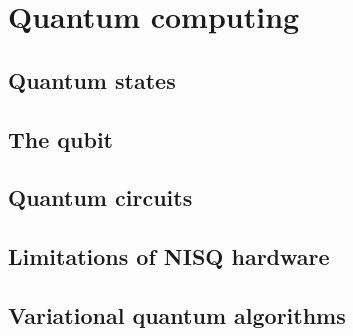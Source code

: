 \chapter{Quantum computing}

\section{Quantum states}

\section{The qubit}

\section{Quantum circuits}

\section{Limitations of NISQ hardware}

\section{Variational quantum algorithms}